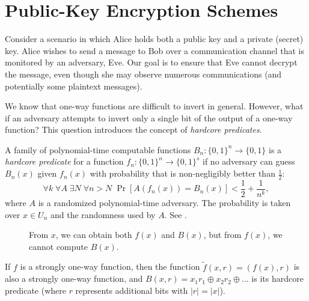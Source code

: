 
\section{Public-Key Encryption Schemes}

Consider a scenario in which Alice holds both a public key and a private (secret) key.
Alice wishes to send a message to Bob over a communication channel that is monitored by an adversary, Eve.
Our goal is to ensure that Eve cannot decrypt the message, even though she may observe numerous communications (and potentially some plaintext messages).

We know that one-way functions are difficult to invert in general.
However, what if an adversary attempts to invert only a single bit of the output of a one-way function?
This question introduces the concept of \emph{hardcore predicates}.

\begin{definition}
    A family of polynomial-time computable functions $B_n \colon \{0, 1\}^n \to \{0, 1\}$ is a \emph{hardcore predicate} for a function $f_n \colon \{0, 1\}^n \to \{0, 1\}^s$ if no adversary can guess $B_n(x)$ given $f_n(x)$ with probability that is non-negligibly better than $\frac{1}{2}$:
    \[
        \forall k \; \forall A \; \exists N \; \forall n > N \; \Pr[A(f_n(x)) = B_n(x)] < \frac{1}{2} + \frac{1}{n^{k}},
    \]
    where $A$ is a randomized polynomial-time adversary.
    The probability is taken over $x \in U_n$ and the randomness used by $A$.
    See .
    
    \begin{figure}[H]
        \centering
        \caption{From $x$, we can obtain both $f(x)$ and $B(x)$, but from $f(x)$, we cannot compute $B(x)$.}
        \label{fig:hardcore_predicate}
    \end{figure}
\end{definition}

\begin{theorem} \label{thm:goldreich_levin}
    If $f$ is a strongly one-way function, then the function $\tilde{f}(x, r) = (f(x), r)$ is also a strongly one-way function, and $B(x, r) = x_1 r_1 \oplus x_2 r_2 \oplus \dots$ is its hardcore predicate (where $r$ represents additional bits with $|r| = |x|$).
\end{theorem}

